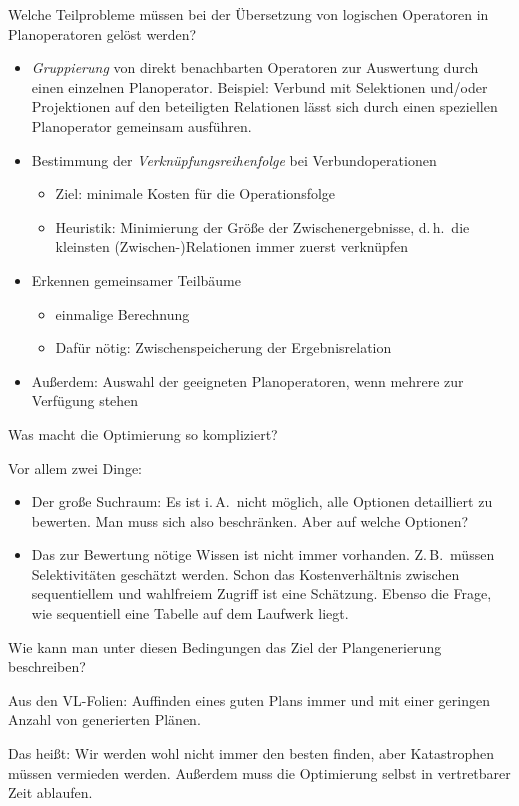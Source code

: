 	\item Welche Teilprobleme müssen bei der Übersetzung von logischen Operatoren in Planoperatoren gelöst werden?

\begin{solution}
\begin{itemize}
	\item \textit{Gruppierung} von direkt benachbarten Operatoren zur Auswertung durch einen einzelnen Planoperator.
	Beispiel: Verbund mit Selektionen und/oder Projektionen auf den beteiligten Relationen lässt sich durch einen speziellen Planoperator gemeinsam ausführen.
	\item Bestimmung der \textit{Verknüpfungsreihenfolge} bei Verbundoperationen
		\begin{itemize}
			\item Ziel: minimale Kosten für die Operationsfolge
			\item Heuristik: Minimierung der Größe der Zwischenergebnisse,
        d.\,h.\ die kleinsten (Zwischen-)Relationen immer zuerst verknüpfen
		\end{itemize}
	\item Erkennen gemeinsamer Teilbäume
		\begin{itemize}
			\item einmalige Berechnung
			\item Dafür nötig: Zwischenspeicherung der Ergebnisrelation
		\end{itemize}
	\item Außerdem: Auswahl der geeigneten Planoperatoren, wenn mehrere zur Verfügung stehen
	\end{itemize}
\end{solution}

	\item Was macht die Optimierung so kompliziert?

\begin{solution}
Vor allem zwei Dinge:
\begin{itemize}
	\item Der große Suchraum: Es ist i.\,A.\ nicht möglich, alle Optionen detailliert zu bewerten. Man muss sich also beschränken. Aber auf welche Optionen?
	\item Das zur Bewertung nötige Wissen ist nicht immer vorhanden. Z.\,B.\ müssen Selektivitäten geschätzt werden. Schon das Kostenverhältnis zwischen sequentiellem und wahlfreiem Zugriff ist eine Schätzung.
		Ebenso die Frage, wie sequentiell eine Tabelle auf dem Laufwerk liegt.
\end{itemize}
\end{solution}

	\item Wie kann man unter diesen Bedingungen das Ziel der Plangenerierung beschreiben?

\begin{solution}
Aus den VL-Folien: Auffinden eines guten Plans immer und mit einer geringen Anzahl von generierten Plänen.

Das heißt: Wir werden wohl nicht immer den besten finden, aber Katastrophen müssen vermieden werden. Außerdem muss die Optimierung selbst in vertretbarer Zeit ablaufen.
\end{solution}
